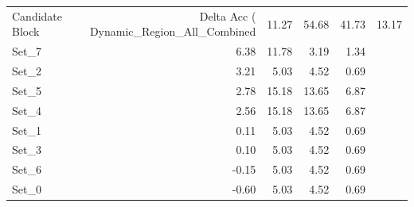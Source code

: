 \begin{tabular}{lrrrr}
\toprule
Candidate Block & Delta Acc (%
\midrule
Dynamic_Region_All_Combined & 11.27 & 54.68 & 41.73 & 13.17 \\
Set_7 & 6.38 & 11.78 & 3.19 & 1.34 \\
Set_2 & 3.21 & 5.03 & 4.52 & 0.69 \\
Set_5 & 2.78 & 15.18 & 13.65 & 6.87 \\
Set_4 & 2.56 & 15.18 & 13.65 & 6.87 \\
Set_1 & 0.11 & 5.03 & 4.52 & 0.69 \\
Set_3 & 0.10 & 5.03 & 4.52 & 0.69 \\
Set_6 & -0.15 & 5.03 & 4.52 & 0.69 \\
Set_0 & -0.60 & 5.03 & 4.52 & 0.69 \\
\bottomrule
\end{tabular}
